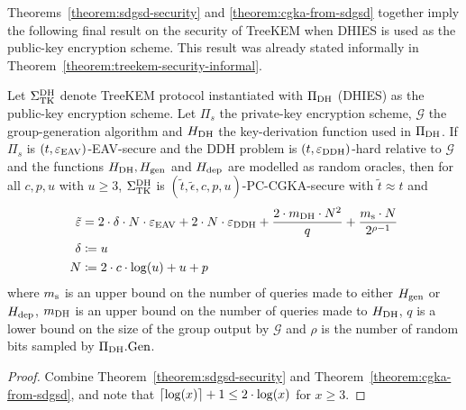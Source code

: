 Theorems~\ref{theorem:sdgsd-security} and \ref{theorem:cgka-from-sdgsd} together imply the following final result on the security of TreeKEM when DHIES is used as the public-key encryption scheme. This result was already stated informally in Theorem~\ref{theorem:treekem-security-informal}.

\begin{theorem} \label{theorem:treekem-security}
	Let $\Sigma_{\mathrm{TK}}^{\mathrm{DH}}$ denote TreeKEM protocol instantiated with $\Pi_{\mathrm{DH}}$ (DHIES) as the public-key encryption scheme. Let $\Pi_s$ the private-key encryption scheme, $\mathcal{G}$ the group-generation algorithm and $H_\mathrm{DH}$ the key-derivation function used in $\Pi_{\mathrm{DH}}$.
	If $\Pi_s$ is $(t, \varepsilon_\mathrm{EAV})$-EAV-secure and the DDH problem is $(t, \varepsilon_\mathrm{DDH})$-hard relative to $\mathcal{G}$ and the functions $H_\mathrm{DH}, H_\mathrm{gen}$ and $H_\mathrm{dep}$ are modelled as random oracles, then for all $c, p, u$ with $u \ge 3$, $\Sigma_{\mathrm{TK}}^{\mathrm{DH}}$ is $(\tilde{t}, \tilde{\epsilon}, c, p, u)$-PC-CGKA-secure with $\tilde{t} \approx t$ and
	\begin{align*}
		\tilde{\varepsilon} & = 2 \cdot \delta \cdot N \cdot \varepsilon_\mathrm{EAV} + 2 \cdot N \cdot \varepsilon_\mathrm{DDH} + \frac{2 \cdot m_\mathrm{DH} \cdot N^2}{q} + \frac{m_\mathrm{s} \cdot N}{2^{\rho - 1}} \\
		\delta           & \coloneqq u                                                                                                                        \\
		N                & \coloneqq 2 \cdot c \cdot \log(u) + u + p
	\end{align*}
	where $m_\mathrm{s}$ is an upper bound on the number of queries made to either $H_\mathrm{gen}$ or $H_\mathrm{dep}$, $m_\mathrm{DH}$ is an upper bound on the number of queries made to $H_\mathrm{DH}$, $q$ is a lower bound on the size of the group output by $\mathcal{G}$ and $\rho$ is the number of random bits sampled by $\Pi_{\mathrm{DH}}.\mathrm{Gen}$.
\end{theorem}

\begin{proof}
	Combine Theorem~\ref{theorem:sdgsd-security} and Theorem~\ref{theorem:cgka-from-sdgsd}, and note that $\lceil\log(x)\rceil + 1 \le 2 \cdot \log(x)$ for $x \ge 3$.
\end{proof}
